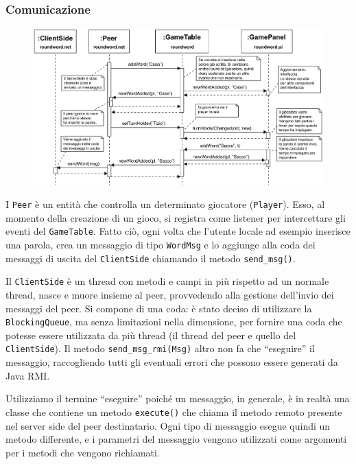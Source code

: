 \documentclass[10.5pt]{article}
\begin{document}
\subsubsection{Comunicazione}

\begin{figure}
	\begin{center}
		\hspace*{-0.2in}
		\includegraphics[scale=0.55]{imgs/Sequence1.pdf}		
		\caption{}\label{fig:sequence1}
	\end{center}
\end{figure}	


I \texttt{Peer} è un entità che controlla un determinato giocatore (\texttt{Player}). Esso, al momento della creazione di un gioco, si registra come listener per intercettare gli eventi del \texttt{GameTable}. Fatto ciò, ogni volta che l'utente locale ad esempio inserisce una parola, crea un messaggio di tipo \texttt{WordMsg} e lo aggiunge alla coda dei messaggi di uscita del \texttt{ClientSide} chiamando il metodo \texttt{send\_msg()}.

Il \texttt{ClientSide} è un thread con metodi e campi in più rispetto ad un normale thread, nasce e muore insieme al peer, provvedendo alla gestione dell'invio dei messaggi del peer. Si compone di una coda: è stato deciso di utilizzare la \texttt{BlockingQueue}, ma senza limitazioni nella dimensione, per fornire una coda che potesse essere utilizzata da più thread (il thread del peer e quello del \texttt{ClientSide}). Il metodo \texttt{send\_msg\_rmi(Msg)} altro non fa che ``eseguire'' il messaggio, raccogliendo tutti gli eventuali errori che possono essere generati da Java RMI. 

Utilizziamo il termine ``eseguire'' poiché un messaggio, in generale, è in realtà una classe che contiene un metodo \texttt{execute()} che chiama il metodo remoto presente nel server side del peer destinatario. Ogni tipo di messaggio esegue quindi un metodo differente, e i parametri del messaggio vengono utilizzati come argomenti per i metodi che vengono richiamati. 
\end{document}
